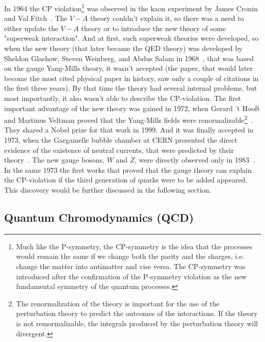 In 1964 the CP violation\footnote{Much like the P-symmetry, the CP-symmetry is the idea that the processes would remain the same if we change both the parity and the charges, i.e. change the matter into antimatter and vise versa. The CP-symmetry was introduced after the confirmation of the P-symmetry violation as the new fundamental symmetry of the quantum processes.} was observed in the kaon experiment by James Cronin and Val Fitch~\cite{lib:theory_qed_cp_violation}. The $V-A$ theory couldn't explain it, so there was a need to either update the $V-A$ theory or to introduce the new theory of some "superweak interaction". And at first, such superweak theories were developed, so when the new theory (that later became the QED theory) was developed by Sheldon Glashow, Steven Weinberg, and Abdus Salam in 1968~\cite{lib:theory_qed_weinberg}, that was based on the gauge Yang-Mills theory, it wasn't accepted (the paper, that would later become the most cited physical paper in history, saw only a couple of citations in the first three years). By that time the theory had several internal problems, but most importantly, it also wasn't able to describe the CP-violation. The first important advantage of the new theory was gained in 1972, when Gerard 't Hooft and Martinus Veltman proved that the Yang-Mills fields were renormalizable\footnote{The renormalization of the theory is important for the use of the perturbation theory to predict the outcomes of the interactions. If the theory is not remormalizable, the integrals produced by the perturbation theory will divergent.}~\cite{lib:theory_qed_renorm}. They shared a Nobel prize for that work in 1999. And it was finally accepted in 1973, when the Gargamelle bubble chamber at CERN presented the direct evidence of the existence of neutral currents, that were predicted by their theory~\cite{lib:theory_qed_neut_cur}. The new gauge bosons, $W$ and $Z$, were directly observed only in 1983~\cite{lib:theory_qed_wz}. In the same 1973 the first works that proved that the gauge theory can explain the CP-violation if the third generation of quarks were to be added appeared. This discovery would be further discussed in the following section.

\subsection{Quantum Chromodynamics (QCD)}

